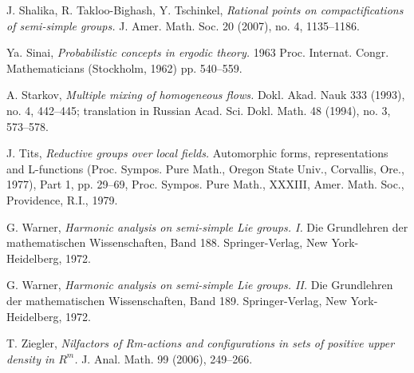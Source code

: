 \documentclass[11pt,reqno,a4paper]{amsart}
\numberwithin{equation}{section}
\theoremstyle{theorem}
\theoremstyle{definition}
\begin{document}
\begin{thebibliography}{99}
 J. Shalika, R. Takloo-Bighash, Y. Tschinkel,
\emph{Rational points on compactifications of semi-simple groups.} J. Amer. Math. Soc. 20 (2007), no. 4, 1135--1186.

 Ya. Sinai, \emph{Probabilistic concepts in ergodic theory.}
1963 Proc. Internat. Congr. Mathematicians (Stockholm, 1962) pp. 540--559.

A. Starkov, \emph{Multiple mixing of homogeneous flows.} Dokl. Akad. Nauk 333 (1993), no. 4, 442--445; translation in Russian Acad. Sci. Dokl. Math. 48 (1994), no. 3, 573--578.

 J. Tits, \emph{Reductive groups over local fields.} Automorphic forms, representations and L-functions (Proc. Sympos. Pure Math., Oregon State Univ., Corvallis, Ore., 1977), Part 1, pp. 29--69, Proc. Sympos. Pure Math., XXXIII, Amer. Math. Soc., Providence, R.I., 1979.

 G. Warner, \emph{Harmonic analysis on semi-simple Lie groups. I.} Die Grundlehren der mathematischen Wissenschaften, Band 188. Springer-Verlag, New York-Heidelberg, 1972.

 G. Warner, \emph{Harmonic analysis on semi-simple Lie groups. II.} Die Grundlehren der mathematischen Wissenschaften, Band 189. Springer-Verlag, New York-Heidelberg, 1972.

 T. Ziegler, \emph{Nilfactors of Rm-actions and configurations in sets of positive upper density in $R^m$.} J. Anal. Math. 99 (2006), 249--266. 



\end{thebibliography}
\end{document}
